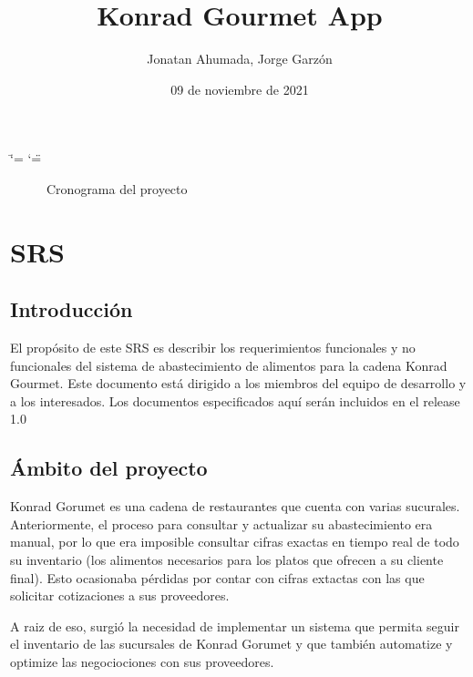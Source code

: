 \documentclass[letterpaper,10pt,spanish]{sphinxmanual}
\title{Konrad Gourmet App}
\date{09 de noviembre de 2021}
\author{Jonatan Ahumada, Jorge Garzón}
\let\sphinxpxdimen\pdfpxdimen\else\newdimen\sphinxpxdimen
\begin{document}
\ifdefined\shorthandoff
  \ifnum\catcode`\=\string=\active\shorthandoff{=}\fi
  \ifnum\catcode`\"=\active{}\fi
\fi

\pagestyle{empty}
\sphinxmaketitle
\pagestyle{plain}
\sphinxtableofcontents
\pagestyle{normal}
\label{\detokenize{index::doc}}


\begin{figure}[htbp]
\centering
\capstart

\noindent\sphinxincludegraphics[width=600\sphinxpxdimen]{{cronograma}.png}
\caption{Cronograma del proyecto}\label{\detokenize{index:id1}}
\begin{sphinxlegend}\begin{quote}
\end{quote}
\end{sphinxlegend}
\end{figure}


\chapter{SRS}
\label{\detokenize{SRS:srs}}\label{\detokenize{SRS::doc}}

\section{Introducción}
\label{\detokenize{SRS:introduccion}}
\sphinxAtStartPar
El propósito de este SRS es
describir los requerimientos
funcionales y no funcionales
del sistema de abastecimiento
de alimentos para la cadena
Konrad Gourmet. Este documento
está dirigido a los miembros
del equipo de desarrollo
y a los interesados. Los
documentos especificados
aquí serán incluidos en el release
1.0


\section{Ámbito del proyecto}
\label{\detokenize{SRS:ambito-del-proyecto}}
\sphinxAtStartPar
Konrad Gorumet es una cadena de
restaurantes que cuenta con varias sucurales.
Anteriormente, el proceso para consultar y
actualizar su abastecimiento era manual,
por lo que era imposible consultar
cifras exactas en tiempo real de todo
su inventario (los alimentos necesarios para
los platos que ofrecen a su cliente final). Esto ocasionaba pérdidas
por contar con cifras extactas con las
que solicitar cotizaciones a sus proveedores.

\sphinxAtStartPar
A raiz de eso, surgió la necesidad de implementar
un sistema que permita seguir el inventario
de las sucursales de Konrad Gorumet y que también automatize
y optimize las negociociones con sus proveedores.
\end{document}
